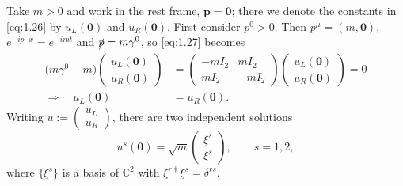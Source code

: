 \documentclass[11pt,a4paper]{article}
\newcommand{\topic}[1]{\par\addvspace{\medskipamount}\noindent{\bfseries\boldmath #1}\par\nopagebreak}
\begin{document}
Take $m>0$ and work in the rest frame, $\mathbf p=\mathbf 0$; there we denote the constants in \eqref{eq:1.26} by $u_L(\mathbf 0)$ and $u_R(\mathbf 0)$. First consider $p^0>0$. Then $p^\mu=(m,\mathbf 0)$, $e^{-ip\cdot x}=e^{-imt}$ and $\slashed{p}=m\gamma^0$, so \eqref{eq:1.27} becomes
\begin{equation*}
\begin{aligned}
\bigl(m\gamma^0-m\bigr)\begin{pmatrix}u_L(\mathbf 0)\\u_R(\mathbf 0)\end{pmatrix}
&=\begin{pmatrix}-mI_2&mI_2\\mI_2&-mI_2\end{pmatrix}
\begin{pmatrix}u_L(\mathbf 0)\\u_R(\mathbf 0)\end{pmatrix}=0\\[6pt]
\Longrightarrow\quad u_L(\mathbf 0)&=u_R(\mathbf 0).
\end{aligned}
\tag{1.28}\label{eq:1.28}
\end{equation*}
Writing $u:=\begin{pmatrix}u_L\\u_R\end{pmatrix}$, there are two independent solutions
\begin{equation*}
u^s(\mathbf 0)=\sqrt m\begin{pmatrix}\xi^s\\\xi^s\end{pmatrix},\qquad s=1,2,
\tag{1.29}\label{eq:1.29}
\end{equation*}
where $\{\xi^s\}$ is a basis of $\mathbb C^2$ with $\xi^{r\dagger}\xi^s=\delta^{rs}$.

\topic{(2) Boost}
\end{document}
